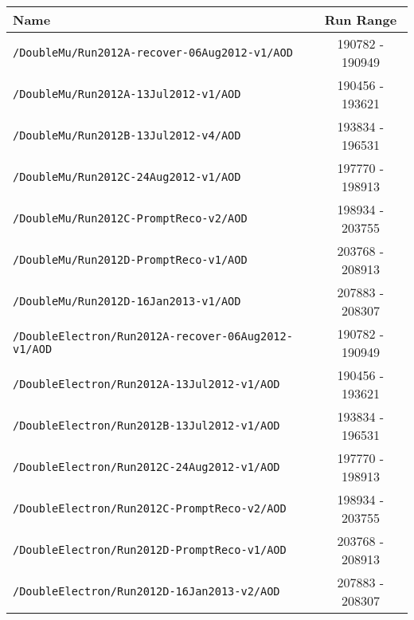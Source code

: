 \begin{table}[hbt]
\begin{center}
\begin{tabular}{lc}\hline\hline
Name		& Run Range \\ \hline
\verb=/DoubleMu/Run2012A-recover-06Aug2012-v1/AOD=                 &   190782 - 190949\\ 
\verb=/DoubleMu/Run2012A-13Jul2012-v1/AOD=                                  &  190456 - 193621                     \\ 
\verb=/DoubleMu/Run2012B-13Jul2012-v4/AOD=                                  &  193834 - 196531                     \\ 
\verb=/DoubleMu/Run2012C-24Aug2012-v1/AOD=                                &  197770 - 198913 \\  
\verb=/DoubleMu/Run2012C-PromptReco-v2/AOD=                               &  198934 - 203755                     \\ 
\verb=/DoubleMu/Run2012D-PromptReco-v1/AOD=                               &  203768 - 208913  \\
\verb=/DoubleMu/Run2012D-16Jan2013-v1/AOD=                                 &  207883 - 208307  \\

\verb=/DoubleElectron/Run2012A-recover-06Aug2012-v1/AOD=         &   190782 - 190949                    \\ 
\verb=/DoubleElectron/Run2012A-13Jul2012-v1/AOD=                         & 190456 - 193621                      \\ 
\verb=/DoubleElectron/Run2012B-13Jul2012-v1/AOD=                         &  193834 - 196531 \\ 
\verb=/DoubleElectron/Run2012C-24Aug2012-v1/AOD=                       &   197770 - 198913                    \\ 
\verb=/DoubleElectron/Run2012C-PromptReco-v2/AOD=                     &    198934 - 203755                  \\ 
\verb=/DoubleElectron/Run2012D-PromptReco-v1/AOD=                      &  203768 - 208913  \\
\verb=/DoubleElectron/Run2012D-16Jan2013-v2/AOD=                        &   207883 - 208307 \\


\end{tabular}
\end{center}
\end{table}
